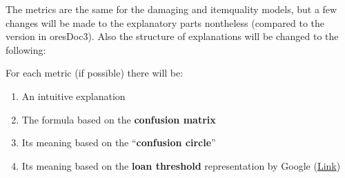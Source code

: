 \documentclass[12pt,a4paper]{article}
\begin{document}
\begin{description}
\item The metrics are the same for the damaging and itemquality models, but a few changes will be made to the explanatory parts nontheless (compared to the version in oresDoc3). Also the structure of explanations will be changed to the following:
\item For each metric (if possible) there will be:
\begin{enumerate}
\item An intuitive explanation
\item The formula based on the \textbf{confusion matrix}
\item Its meaning based on the ``\textbf{confusion circle}''
\item Its meaning based on the \textbf{loan threshold} representation by Google (\href{https://research.google.com/bigpicture/attacking-discrimination-in-ml/}{Link})
\end{enumerate}
\end{description}
\end{document}

